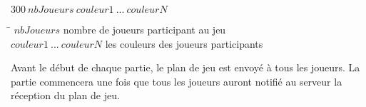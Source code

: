 \par

$300 ~ nbJoueurs ~ {couleur1 ~ ... ~ couleurN}$
\begin{tabbing}
\hspace{4cm}\=\kill
 $nbJoueurs$ \> nombre de joueurs participant au jeu \\
 $couleur1 ~ ... ~ couleurN$ \> les couleurs des joueurs participants\\
\end{tabbing} 

Avant le début de chaque partie, le plan de jeu est envoyé à tous les joueurs. La partie commencera une fois que tous les joueurs auront notifié au serveur la réception du plan de jeu. \\
